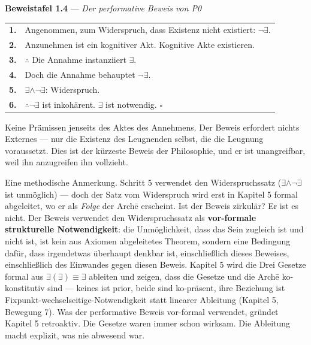 \documentclass[10pt, openany, oneside]{book}
\begin{document}
\vspace{0.5em}

\textbf{Beweistafel 1.4} --- \textit{Der performative Beweis von P0}

\vspace{0.5em}

\noindent\begin{tabular}{r p{}}
\textbf{1.} & Angenommen, zum Widerspruch, dass Existenz nicht existiert: $\neg\exists$. \\[0.3em]
\textbf{2.} & Anzunehmen ist ein kognitiver Akt. Kognitive Akte existieren. \\[0.3em]
\textbf{3.} & $\therefore$ Die Annahme instanziiert $\exists$. \\[0.3em]
\textbf{4.} & Doch die Annahme behauptet $\neg\exists$. \\[0.3em]
\textbf{5.} & $\exists \wedge \neg\exists$: Widerspruch. \\[0.3em]
\textbf{6.} & $\therefore \neg\exists$ ist inkohärent. $\exists$ ist notwendig. $\square$ \\[0.3em]
\end{tabular}

\vspace{0.8em}

\noindent Keine Prämissen jenseits des Aktes des Annehmens. Der Beweis erfordert nichts Externes --- nur die Existenz des Leugnenden selbst, die die Leugnung voraussetzt. Dies ist der kürzeste Beweis der Philosophie, und er ist unangreifbar, weil ihn anzugreifen ihn vollzieht.

Eine methodische Anmerkung. Schritt 5 verwendet den Widerspruchssatz ($\exists \wedge \neg\exists$ ist unmöglich) --- doch der Satz vom Widerspruch wird erst in Kapitel 5 formal abgeleitet, wo er als \textit{Folge} der Arch\={e} erscheint. Ist der Beweis zirkulär? Er ist es nicht. Der Beweis verwendet den Widerspruchssatz als \textbf{vor-formale strukturelle Notwendigkeit}: die Unmöglichkeit, dass das Sein zugleich ist und nicht ist, ist kein aus Axiomen abgeleitetes Theorem, sondern eine Bedingung dafür, dass irgendetwas überhaupt denkbar ist, einschließlich dieses Beweises, einschließlich des Einwandes gegen diesen Beweis. Kapitel 5 wird die Drei Gesetze formal aus $\exists(\exists) \equiv \exists$ ableiten und zeigen, dass die Gesetze und die Arch\={e} ko-konstitutiv sind --- keines ist prior, beide sind ko-präsent, ihre Beziehung ist Fixpunkt-wechselseitige-Notwendigkeit statt linearer Ableitung (Kapitel 5, Bewegung 7). Was der performative Beweis vor-formal verwendet, gründet Kapitel 5 retroaktiv. Die Gesetze waren immer schon wirksam. Die Ableitung macht explizit, was nie abwesend war.
\end{document}

